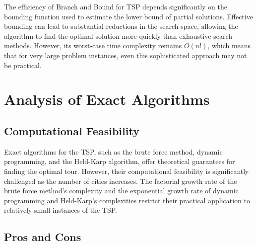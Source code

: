 The efficiency of Branch and Bound for TSP depends significantly on the bounding function used to estimate the lower bound of partial solutions. Effective bounding can lead to substantial reductions in the search space, allowing the algorithm to find the optimal solution more quickly than exhaustive search methods. However, its worst-case time complexity remains $O(n!)$, which means that for very large problem instances, even this sophisticated approach may not be practical.


\section{Analysis of Exact Algorithms}

\subsection{Computational Feasibility}

Exact algorithms for the TSP, such as the brute force method, dynamic programming, and the Held-Karp algorithm, offer theoretical guarantees for finding the optimal tour. However, their computational feasibility is significantly challenged as the number of cities increases. The factorial growth rate of the brute force method's complexity and the exponential growth rate of dynamic programming and Held-Karp's complexities restrict their practical application to relatively small instances of the TSP.

\begin{center}
\end{center}

\subsection{Pros and Cons}

